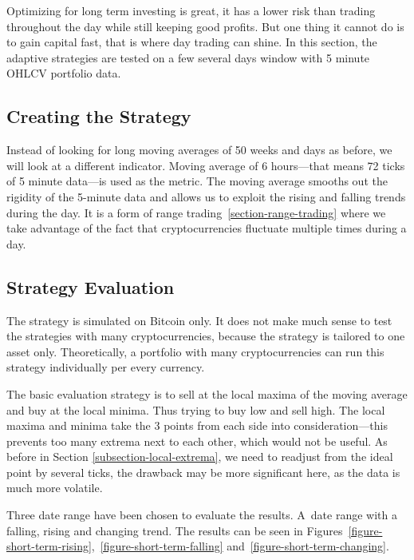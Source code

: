 Optimizing for long term investing is great, it has a lower risk than trading throughout the day while still keeping good profits. But one thing it cannot do is to gain capital fast, that is where day trading can shine. In this section, the adaptive strategies are tested on a few several days window with 5 minute OHLCV portfolio data.

\subsection*{Creating the Strategy}
Instead of looking for long moving averages of 50 weeks and days as before, we will look at a different indicator. Moving average of 6 hours---that means 72 ticks of 5 minute data---is used as the metric. The moving average smooths out the rigidity of the 5-minute data and allows us to exploit the rising and falling trends during the day. It is a form of range trading~\ref{section-range-trading} where we take advantage of the fact that cryptocurrencies fluctuate multiple times during a day.

\subsection*{Strategy Evaluation}
The strategy is simulated on Bitcoin only. It does not make much sense to test the strategies with many cryptocurrencies, because the strategy is tailored to one asset only. Theoretically, a portfolio with many cryptocurrencies can run this strategy individually per every currency.

The basic evaluation strategy is to sell at the local maxima of the moving average and buy at the local minima. Thus trying to buy low and sell high. The local maxima and minima take the 3 points from each side into consideration---this prevents too many extrema next to each other, which would not be useful. As before in Section \ref{subsection-local-extrema}, we need to readjust from the ideal point by several ticks, the drawback may be more significant here, as the data is much more volatile.

Three date range have been chosen to evaluate the results. A~date range with a falling, rising and changing trend. The results can be seen in Figures~\ref{figure-short-term-rising},~\ref{figure-short-term-falling} and~\ref{figure-short-term-changing}.

